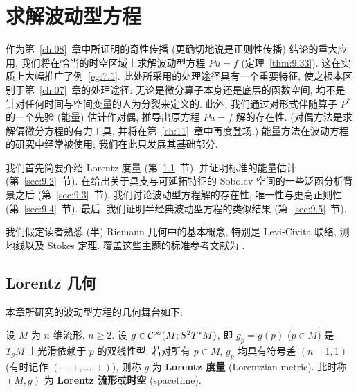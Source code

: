 

\chapter{求解波动型方程}\label{ch:09}

%
%
%
作为第~\ref{ch:08}~章中所证明的奇性传播 (更确切地说是正则性传播) 结论的重大应用, 我们将在恰当的时空区域上求解波动型方程 $P u = f$ (定理~\ref{thm:9.33}). 这在实质上大幅推广了例~\ref{eg:7.5}. 此处所采用的处理途径具有一个重要特征, 使之根本区别于第~\ref{ch:07}~章的处理途径: 无论是微分算子本身还是底层的函数空间, 均不是针对任何时间与空间变量的人为分裂来定义的. 此外, 我们通过对形式伴随算子 $P^*$ 的一个先验 (能量) 估计作对偶, 推导出原方程 $P u = f$ 解的存在性. (对偶方法是求解偏微分方程的有力工具, 并将在第~\ref{ch:11}~章中再度登场.) 能量方法在波动方程的研究中经常被使用; 我们在此只发展其基础部分.

我们首先简要介绍 Lorentz 度量 (第~\ref{sec:9.1}~节), 并证明标准的能量估计 (第~\ref{sec:9.2}~节). 在给出关于具支与可延拓特征的 Sobolev 空间的一些泛函分析背景之后 (第~\ref{sec:9.3}~节), 我们讨论波动型方程解的存在性, 唯一性与更高正则性 (第~\ref{sec:9.4}~节). 最后, 我们证明半经典波动型方程的类似结果 (第~\ref{sec:9.5}~节).

我们假定读者熟悉 (半) Riemann 几何中的基本概念, 特别是 Levi-Civita 联络, 测地线以及 Stokes 定理. 覆盖这些主题的标准参考文献为 \cite{HE73,ON83,Lee18}.

\section{Lorentz 几何}\label{sec:9.1}
%
%
%

本章所研究的波动型方程的几何舞台如下:

\begin{definition}[Lorentz 流形]\label{def:9.1}
设 $M$ 为 $n$ 维流形, $n \ge 2$. 设 $g \in \mathcal{C}^\infty(M; S^2 T^* M)$, 即 $g_p = g(p)$ ($p \in M$) 是 $T_p M$ 上光滑依赖于 $p$ 的双线性型. 若对所有 $p \in M$, $g_p$ 均具有符号差 $(n-1, 1)$ (有时记作 $(-, +, \ldots, +)$), 则称 $g$ 为 \textbf{Lorentz 度量} (Lorentzian metric). 此时称 $(M, g)$ 为 \textbf{Lorentz 流形}或\textbf{时空} (spacetime).
\end{definition}


